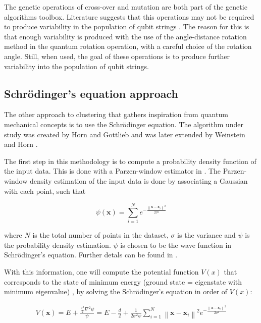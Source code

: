 The genetic operations of cross-over and mutation are both part of the genetic algorithms toolbox.
Literature suggests that this operations may not be required to produce variability in the population of qubit strings \cite{Liu2010}.
The reason for this is that enough variability is produced with the use of the angle-distance rotation method \cite{Liu2010} in the quantum rotation operation, with a careful choice of the rotation angle.
Still, when used, the goal of these operations is to produce further variability into the population of qubit strings.

\subsection{Schrödinger's equation approach} %
\label{sec:horn}

The other approach to clustering that gathers inspiration from quantum mechanical concepts is to use the Schrödinger equation.
The algorithm under study was created by Horn and Gottlieb \cite{Horn2010} and was later extended by Weinstein and Horn \cite{Weinstein2009}.

The first step in this methodology is to compute a probability density function of the input data.
This is done with a Parzen-window estimator in \cite{Horn2001a,Weinstein2009}.
The Parzen-window density estimation of the input data is done by associating a Gaussian with each point, such that

$$ \psi (\mathbf{x}) = \sum ^N _{i=1} e^{- \frac{\left \| \mathbf{x}-\mathbf{x}_i \right \| ^2}{2 \sigma ^2}} $$

where $N$ is the total number of points in the dataset, $\sigma$ is the variance and $\psi$ is the probability density estimation. $\psi$ is chosen to be the wave function in Schrödinger's equation.
Further detals can be found in \citet{Weinstein2009,Horn2001a,Horn2001b}.

With this information, one will compute the potential function $V(x)$ that corresponds to the state of minimum energy (ground state = eigenstate with minimum eigenvalue) \cite{Horn2001a}, by solving the Schrödinger's equation in order of $V(x)$:      

\begin{align}

V(\mathbf{x}) = E + \frac {\frac{\sigma^2}{2}\nabla^2 \psi }{\psi} 
= E - \frac{d}{2} + \frac {1}{2 \sigma^2 \psi} \sum ^N _{i=1} \left \| \mathbf{x}-\mathbf{x}_i \right \| ^2 e^{- \frac{\left \| \mathbf{x}-\mathbf{x}_i \right \| ^2}{2 \sigma ^2}}
\label{eq:wave}
\end{align}

